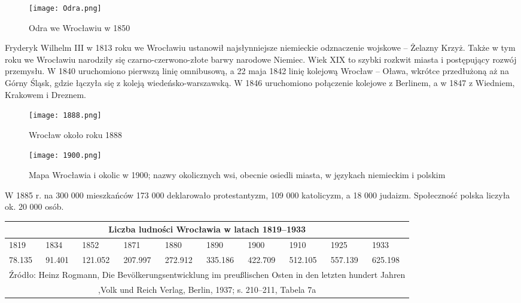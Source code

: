 \documentclass{article}
\begin{document}
\begin{center}
\begin{figure}[h]
	\centering
	\texttt{[image: Odra.png]}
	\caption{Odra we Wrocławiu w 1850}
\end{figure}
\end{center}

Fryderyk Wilhelm III w 1813 roku we Wrocławiu ustanowił najsłynniejsze niemieckie odznaczenie wojskowe – Żelazny Krzyż. Także w tym roku we Wrocławiu narodziły się czarno-czerwono-złote barwy narodowe Niemiec. Wiek XIX to szybki rozkwit miasta i postępujący rozwój przemysłu. W 1840 uruchomiono pierwszą linię omnibusową, a 22 maja 1842 linię kolejową Wrocław – Oława, wkrótce przedłużoną aż na Górny Śląsk, gdzie łączyła się z koleją wiedeńsko-warszawską. W 1846 uruchomiono połączenie kolejowe z Berlinem, a w 1847 z Wiedniem, Krakowem i Dreznem.


\begin{center}
\begin{figure}[h]
	\centering
	\texttt{[image: 1888.png]}
	\caption{Wrocław około roku 1888}
\end{figure}
\end{center}

\begin{center}
\begin{figure}[h]
	\centering
	\texttt{[image: 1900.png]}
	\caption{Mapa Wrocławia i okolic w 1900;
nazwy okolicznych wsi, obecnie osiedli miasta, w językach niemieckim i polskim}
\end{figure}
\end{center}

\newpage
W 1885 r. na 300 000 mieszkańców 173 000 deklarowało protestantyzm, 109 000 katolicyzm, a 18 000 judaizm. Społeczność polska liczyła ok. 20 000 osób.

\begin{center}
\begin{tabular}{ |p{}|p{}|p{}|p{}|p{}|p{}|p{}|p{}|p{}|p{}| }
\hline
\multicolumn{10}{|c|}{Liczba ludności Wrocławia w latach 1819–1933} \\
\hline
 1819 & 1834 & 1852 & 1871 & 1880 & 1890 & 1900 & 1910 & 1925 & 1933\\ 
 \hline
78.135 & 91.401 & 121.052 & 207.997 & 272.912 & 335.186 & 422.709 & 512.105 & 557.139 & 625.198\\
\hline
\multicolumn{10}{|c|}{Źródło: Heinz Rogmann, Die Bevölkerungsentwicklung im preußlischen Osten in den letzten hundert Jahren} \\
\multicolumn{10}{|c|}{,Volk und Reich Verlag, Berlin, 1937; s. 210–211, Tabela 7a} \\
\hline
\end{tabular}
\end{center}
\end{document}
